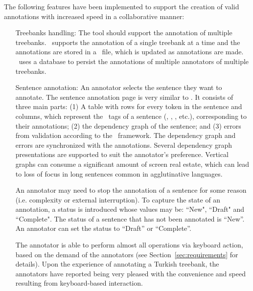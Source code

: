 The following features have been implemented to support the creation of valid annotations with increased speed in a collaborative manner:
\begin{itemize}[before=\normalfont, font=\itshape, align=left,noitemsep,topsep=0pt,parsep=3pt,partopsep=0pt,labelsep=3pt,align=left]
    \item[Treebanks handling:]
        The tool should support the annotation of multiple treebanks.
        \boatvone\ supports the annotation of a single treebank at a time and the annotations are stored in a \conllu\ file, which is updated as annotations are made.
        \boatvtwo\ uses a database to persist the annotations of multiple annotators of multiple treebanks.

    \item[Sentence annotation:]
    	An annotator selects the sentence they want to annotate.
        The sentence annotation page is very similar to \boatvone.
        It consists of three main parts: (1) A table with rows for every token in the sentence and columns, which represent the \ud\ tags of a sentence (\form, \lemma, \deprel, etc.), corresponding to their annotations; (2) the dependency graph of the sentence; and (3) errors from validation according to the \ud\ framework.
        The dependency graph and errors are synchronized with the annotations.
        Several dependency graph presentations are supported to suit the annotator's preference.
        Vertical graphs can consume a significant amount of screen real estate, which can lead to loss of focus in long sentences common in agglutinative languages.

        An annotator may need to stop the annotation of a sentence for some reason (i.e. complexity or external interruption).
        To capture the state of an annotation, a status is introduced whose values may be: ``New", ``Draft" and ``Complete".
        The status of a sentence that has not been annotated is ``New''.
	An annotator can set the status to ``Draft'' or ``Complete''.

        The annotator is able to perform almost all operations via keyboard action, based on the demand of the annotators (see Section~\ref{sec:requirements} for details).
        Upon the experience of annotating a Turkish treebank, the annotators have reported being very pleased with the convenience and speed resulting from keyboard-based interaction.


\end{itemize}
